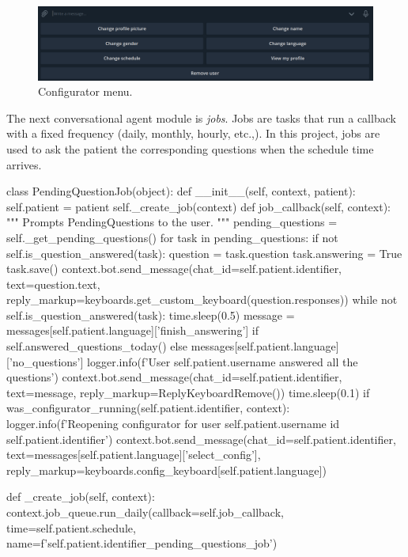 \documentclass[12pt,english]{article}
\begin{document}
\begin{figure}[H]
  \centering
    \includegraphics[width=\textwidth]{config_menu.png}
  \caption{Configurator menu.}
\end{figure}

The next conversational agent module is \emph{jobs}. Jobs are tasks that run a callback with a fixed frequency (daily, monthly, hourly, etc.,). In this project, jobs are used to ask the patient the corresponding questions when the schedule time arrives.

\begin{python}[caption={PendingQuestion job}, captionpos=b]
class PendingQuestionJob(object):
  def __init__(self, context, patient):
      self.patient = patient
      self._create_job(context)
  def job_callback(self, context):
      """
      Prompts PendingQuestions to the user.
      """
      pending_questions = self._get_pending_questions()
      for task in pending_questions:
          if not self.is_question_answered(task):
              question = task.question
              task.answering = True
              task.save()
              context.bot.send_message(chat_id=self.patient.identifier, text=question.text, reply_markup=keyboards.get_custom_keyboard(question.responses))
              while not self.is_question_answered(task):
                  time.sleep(0.5)
      message = messages[self.patient.language]['finish_answering'] if self.answered_questions_today() else messages[self.patient.language]['no_questions']
      logger.info(f'User {self.patient.username} answered all the questions')
      context.bot.send_message(chat_id=self.patient.identifier, text=message, reply_markup=ReplyKeyboardRemove())
      time.sleep(0.1)
      if was_configurator_running(self.patient.identifier, context):
          logger.info(f'Reopening configurator for user {self.patient.username} id {self.patient.identifier}')
          context.bot.send_message(chat_id=self.patient.identifier,  text=messages[self.patient.language]['select_config'], reply_markup=keyboards.config_keyboard[self.patient.language])

  def _create_job(self, context):
      context.job_queue.run_daily(callback=self.job_callback, time=self.patient.schedule, name=f'{self.patient.identifier}_pending_questions_job')
\end{python}
\end{document}

